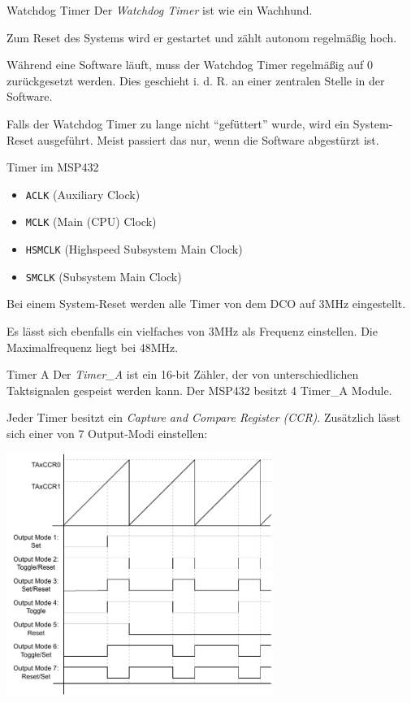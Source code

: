 \begin{defi}{Watchdog Timer}
    Der \emph{Watchdog Timer} ist wie ein Wachhund.

    Zum Reset des Systems wird er gestartet und zählt autonom regelmäßig hoch.

    Während eine Software läuft, muss der Watchdog Timer regelmäßig auf 0 zurückgesetzt werden.
    Dies geschieht i. d. R. an einer zentralen Stelle in der Software.

    Falls der Watchdog Timer zu lange nicht \enquote{gefüttert} wurde, wird ein System-Reset ausgeführt.
    Meist passiert das nur, wenn die Software abgestürzt ist.
\end{defi}

\begin{bonus}{Timer im MSP432}
    \begin{itemize}
        \item \texttt{ACLK} (Auxiliary Clock)
        \item \texttt{MCLK} (Main (CPU) Clock)
        \item \texttt{HSMCLK} (Highspeed Subsystem Main Clock)
        \item \texttt{SMCLK} (Subsystem Main Clock)
    \end{itemize}

    Bei einem System-Reset werden alle Timer von dem DCO auf 3MHz eingestellt.

    Es lässt sich ebenfalls ein vielfaches von 3MHz als Frequenz einstellen.
    Die Maximalfrequenz liegt bei 48MHz.
\end{bonus}

\begin{defi}{Timer A}
    Der \emph{Timer\_A} ist ein 16-bit Zähler, der von unterschiedlichen Taktsignalen gespeist werden kann.
    Der MSP432 besitzt 4 Timer\_A Module.

    Jeder Timer besitzt ein \emph{Capture and Compare Register (CCR)}.
    Zusätzlich lässt sich einer von 7 Output-Modi einstellen:

    \begin{center}
        \includegraphics[width=0.65\textwidth]{includes/figures/defi_timer_a.pdf}
    \end{center}
\end{defi}

